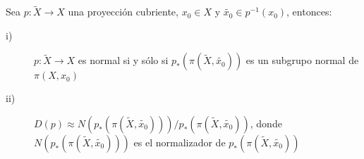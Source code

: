 \begin{theorem}\label{DescripDesliz}
Sea $p: \widetilde{X} \rightarrow X$ una proyecci\'on cubriente, $x_0 \in X$ y $\widetilde{x_0} \in p^{-1}(x_0)$, entonces:\\

\begin{description}

\item[i)]$p: \widetilde{X} \rightarrow X$ es normal si y s\'olo si $p_*(\pi(\widetilde{X},\widetilde{x_0}))$ es un subgrupo normal de $\pi(X,x_0)$\\

\item[ii)]$D(p) \approx N(p_*(\pi(\widetilde{X},\widetilde{x_0})))/p_*(\pi (\widetilde{X},\widetilde{x_0}))$, donde $N(p_*(\pi(\widetilde{X},\widetilde{x_0})))$ es el normalizador de $p_*(\pi (\widetilde{X},\widetilde{x_0}))$\\
\end{description}
\end{theorem}


